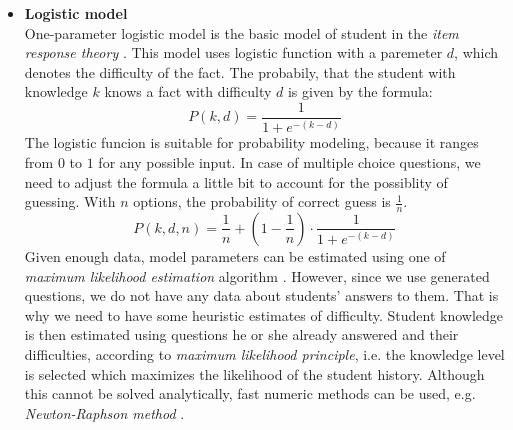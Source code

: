 \documentclass[a4paper, 12pt, twoside]{fithesis2}		%
\renewcommand{\_}{\leavevmode \kern0.07em\vbox{\hrule width0.4em}}
\newcommand{\squarebullet}{\textcolor{black}{\raisebox{0.15em}{\rule{4pt}{4pt}}}}
\newcommand{\emptysquarebullet}{\textcolor{black}{\raisebox{0.10em}{\tiny$\square$}}}
\newenvironment{myItemize}{
  \begin{itemize}[leftmargin=2em,rightmargin=1em,itemsep=\parskip ,parsep=0em,topsep=0em,partopsep=0em]
  \renewcommand{\labelitemi}{\squarebullet}
  \renewcommand{\labelitemii}{\textbullet}
}{
  \end{itemize}
}
\newcounter{choice}
\begin{document}
\begin{myItemize}
\item \textbf{Logistic model}\\
  One-parameter logistic model is the basic model of student in the
  \emph{item response theory} \cite{visual-irt}.
  This model uses logistic function with a paremeter $d$, which denotes the difficulty of the fact.
  The probabily, that the student with knowledge $k$ knows a fact with difficulty $d$ is given by the formula:
  \begin{equation}\label{eq:logistic}
  P(k, d) = \frac{1}{1 + e^{-(k - d)}}
  \end{equation}
  The logistic funcion is suitable for probability modeling, because it ranges from $0$ to $1$ for any possible input.
  In case of multiple choice questions, we need to adjust the formula a little bit to account for the possiblity of guessing.
  With $n$ options, the probability of correct guess is $\frac{1}{n}$.
\begin{equation}\label{eq:logistic-mcq}
P(k, d, n) = \frac{1}{n} + \left( 1 - \frac{1}{n} \right) \cdot \frac{1}{1 + e^{-(k - d)}}
\end{equation}
Given enough data, model parameters can be estimated using
one of \emph{maximum likelihood estimation} algorithm \cite{irt-theory-and-practice}.
However, since we use generated questions, we do not have any data about students' answers to them.
That is why we need to have some heuristic estimates of difficulty.
Student knowledge is then estimated using questions he or she already answered and their difficulties,
according to \emph{maximum likelihood principle}, i.e. the knowledge level is selected which maximizes the likelihood of the student history.
Although this cannot be solved analytically, fast numeric methods can be used,
e.g. \emph{Newton-Raphson method} \cite{irt-ability-estimation}.

\begin{figure}[h]
  \centering


\end{figure}
\end{myItemize}
\end{document}
